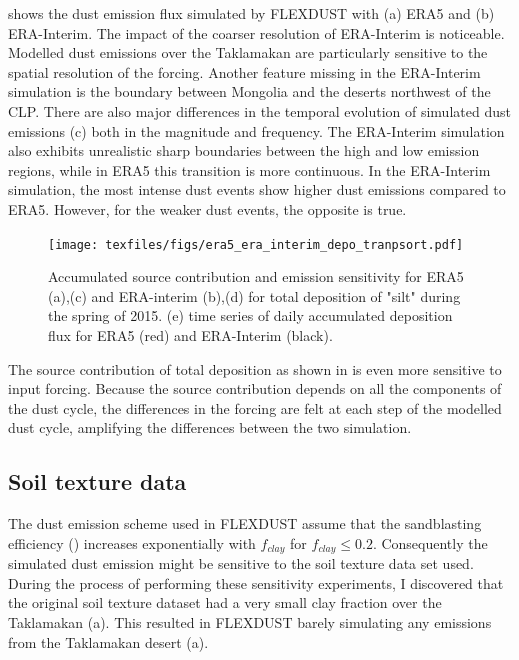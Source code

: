  shows the dust emission flux simulated by FLEXDUST with (a) ERA5 and (b) ERA-Interim. 
The impact of the coarser resolution of ERA-Interim is noticeable.  
Modelled dust emissions over the Taklamakan are particularly sensitive to the spatial resolution of the forcing. 
Another feature missing in the ERA-Interim simulation is the boundary between Mongolia and the deserts northwest of the CLP. There are also major differences in the temporal evolution of simulated dust emissions (c) both in the magnitude and frequency.
The ERA-Interim simulation also exhibits unrealistic sharp boundaries between the high and low emission regions, while in ERA5 this transition is more continuous.  
In the ERA-Interim simulation, the most intense dust events show higher dust emissions compared to ERA5. 
However, for the weaker dust events, the opposite is true. 


\begin{figure}[htbp]
    \centering
    \texttt{[image: texfiles/figs/era5\_era\_interim\_depo\_tranpsort.pdf]}
    \caption{Accumulated source contribution and emission sensitivity for ERA5 (a),(c) and ERA-interim (b),(d) for total deposition of "silt" during the spring of 2015. (e) time series of daily accumulated deposition flux for ERA5 (red) and ERA-Interim (black).}
    \label{fig:era5_era_interim_source}
\end{figure}

The source contribution of total deposition as shown in   is even more sensitive to input forcing. 
Because the source contribution depends on all the components of the dust cycle, the differences in the forcing are felt at each step of the modelled dust cycle, amplifying the differences between the two simulation.

\subsection{Soil texture data}\label{sec:sens_soil}
The dust emission scheme used in FLEXDUST assume that the sandblasting efficiency () increases exponentially with $f_{clay}$ for $f_{clay} \leq 0.2$. Consequently the simulated dust emission might be sensitive to the soil texture data set used.
During the process of performing these sensitivity experiments, I discovered that the original soil texture dataset had a very small clay fraction over the Taklamakan (a). This resulted in FLEXDUST barely simulating any emissions from the Taklamakan desert (a).

